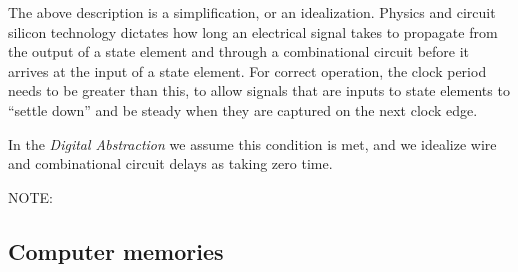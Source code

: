 The above description is a simplification, or an idealization.
Physics and circuit silicon technology dictates how long an electrical
signal takes to propagate from the output of a state element and
through a combinational circuit before it arrives at the input of a
state element.  For correct operation, the clock period needs to be
greater than this, to allow signals that are inputs to state elements
to ``settle down'' and be steady when they are captured on the next
clock edge.


In the \emph{Digital Abstraction} we assume this condition is met, and
we idealize wire and combinational circuit delays as taking zero time.


\vspace{1ex}

NOTE: 

\vspace{1ex}



\subsection{Computer memories}

